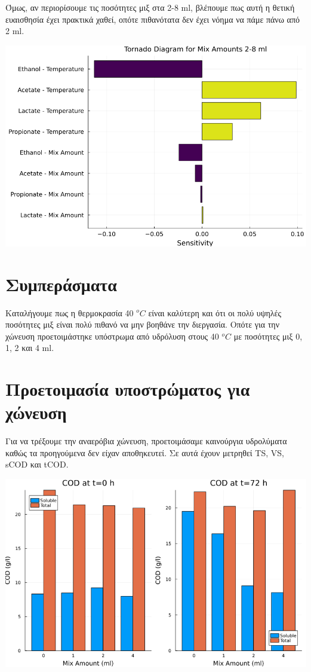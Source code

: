 \documentclass[11pt]{article}
\begin{document}
Όμως, αν περιορίσουμε τις ποσότητες μιξ στα 2-8 ml, βλέπουμε πως αυτή η θετική ευαισθησία έχει πρακτικά χαθεί, οπότε πιθανότατα δεν έχει νόημα να πάμε πάνω από 2 ml.
\begin{center}
\includegraphics[width=.9\linewidth]{../plots/sensitivity/tornado_high.png}
\end{center}

\section{Συμπεράσματα}
\label{sec:orgeb76f50}
Καταλήγουμε πως η θερμοκρασία 40 \(^oC\) είναι καλύτερη και ότι οι πολύ υψηλές ποσότητες μιξ είναι πολύ πιθανό να μην βοηθάνε την διεργασία. Οπότε για την χώνευση προετοιμάστηκε υπόστρωμα από υδρόλυση στους 40 \(^oC\) με ποσότητες μιξ 0, 1, 2 και 4 ml. 

\section{Προετοιμασία υποστρώματος για χώνευση}
\label{sec:orgffdda6e}
Για να τρέξουμε την αναερόβια χώνευση, προετοιμάσαμε καινούργια υδρολύματα καθώς τα προηγούμενα δεν είχαν αποθηκευτεί. Σε αυτά έχουν μετρηθεί TS, VS, sCOD και tCOD.
\begin{center}
\includegraphics[width=.9\linewidth]{../plots/26_03/complete_cod_bar_26_03.png}
\end{center}
\end{document}
